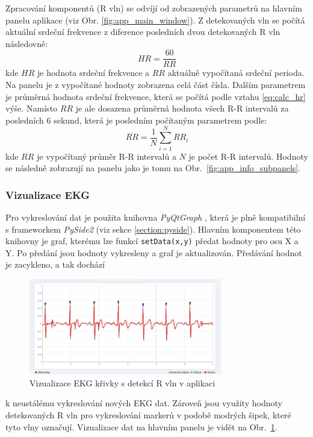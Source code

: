 Zpracování komponentů (R vln) se odvíjí od zobrazených parametrů na hlavním
panelu aplikace (viz Obr. \ref{fig:app_main_window}). Z detekovaných vln se
počítá aktuální srdeční frekvence z diference posledních dvou detekovaných R vln
následovně:
\begin{equation}
    \label{eq:calc_hr}
    HR = \frac{60}{RR}
\end{equation}
kde $HR$ je hodnota srdeční frekvence a $RR$ aktuálně vypočítaná srdeční
perioda. Na panelu je z vypočítané hodnoty zobrazena celá část čísla. Dalším
parametrem je průměrná hodnota srdeční frekvence, která se počítá podle vztahu
\ref{eq:calc_hr} výše. Namísto $RR$ je ale dosazena průměrná hodnota všech R-R
intervalů za posledních 6 sekund, která je posledním počítaným parametrem podle:
\begin{equation}
    \overline{RR} = \frac{1}{N} \sum_{i=1}^N RR_i
\end{equation}
kde $\overline{RR}$ je vypočítaný průměr R-R intervalů a $N$ je počet R-R
intervalů. Hodnoty se následně zobrazují na panelu jako je tomu na
Obr.~\ref{fig:app_info_subpanels}.

\subsubsection{Vizualizace EKG}
\label{section:visual}
Pro vykreslování dat je použita knihovna \textit{PyQtGraph} \cite{PyQtGraph},
která je plně kompatibilní s frameworkem \textit{PySide2} (viz sekce
\ref{section:pyside}). Hlavním komponentem této knihovny je graf, kterému lze
funkcí \texttt{setData(x,y)} \cite{curveItem} předat hodnoty pro osu X a Y. Po
předání jsou hodnoty vykresleny a graf je aktualizován. Předávání hodnot je
zacykleno, a tak dochází
\begin{figure}[H]
    \begin{center}
        \includegraphics[width=0.75\textwidth]{../assets/bbpm/r_detection}
        \caption{Vizualizace EKG křivky s detekcí R vln v aplikaci}
        \label{fig:app_ecg_visual}
    \end{center}
\end{figure}
\noindent k neustálému vykreslování nových EKG dat. Zároveň jsou využity hodnoty
detekovaných R vln pro vykreslování markerů v podobě modrých šipek, které tyto
vlny označují. Vizualizace dat na hlavním panelu je vidět na
Obr.~\ref{fig:app_ecg_visual}.

